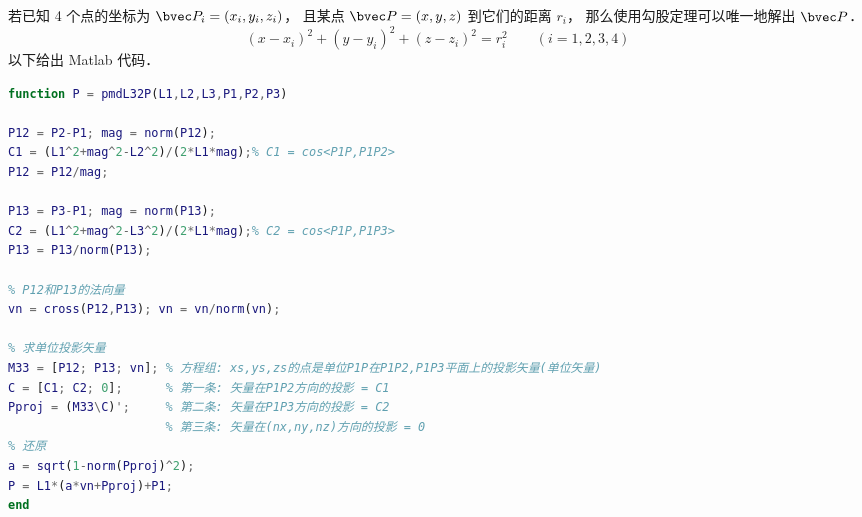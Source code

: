 
\begin{issues}
\issueDraft
\end{issues}

若已知 4 个点的坐标为 $\bvec P_i = (x_i,y_i,z_i)$， 且某点 $\bvec P = (x,y,z)$ 到它们的距离 $r_i$， 那么使用勾股定理可以唯一地解出 $\bvec P$．
\begin{equation}
(x-x_i)^2 + (y-y_i)^2 + (z-z_i)^2 = r_i^2 \qquad (i = 1,2,3,4)
\end{equation}
以下给出 Matlab 代码．

\begin{lstlisting}[language=matlab, caption=pmdL32P.m]
% 已知三棱锥底面的三个点坐标 P1,P2,P3, 和三条棱 L1,L2,L3, 求顶点坐标
function P = pmdL32P(L1,L2,L3,P1,P2,P3)

P12 = P2-P1; mag = norm(P12);
C1 = (L1^2+mag^2-L2^2)/(2*L1*mag);% C1 = cos<P1P,P1P2>
P12 = P12/mag;

P13 = P3-P1; mag = norm(P13);
C2 = (L1^2+mag^2-L3^2)/(2*L1*mag);% C2 = cos<P1P,P1P3>
P13 = P13/norm(P13);

% P12和P13的法向量
vn = cross(P12,P13); vn = vn/norm(vn);

% 求单位投影矢量
M33 = [P12; P13; vn]; % 方程组: xs,ys,zs的点是单位P1P在P1P2,P1P3平面上的投影矢量(单位矢量)
C = [C1; C2; 0];      % 第一条: 矢量在P1P2方向的投影 = C1
Pproj = (M33\C)';     % 第二条: 矢量在P1P3方向的投影 = C2
                      % 第三条: 矢量在(nx,ny,nz)方向的投影 = 0
% 还原
a = sqrt(1-norm(Pproj)^2);
P = L1*(a*vn+Pproj)+P1;
end
\end{lstlisting}

